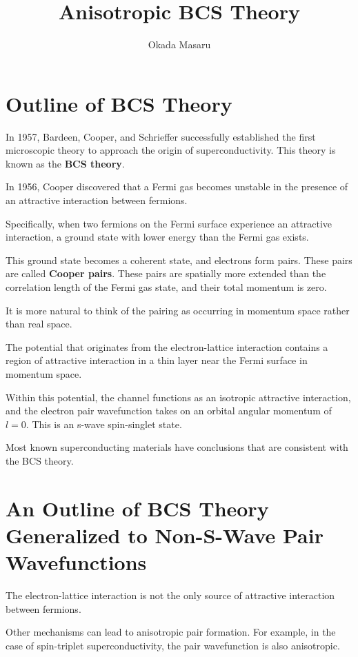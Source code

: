 \documentclass[uplatex,a4j,12pt,dvipdfmx]{jsarticle}
\title{
Anisotropic BCS Theory
}
\author{
Okada Masaru
}
\begin{document}
\maketitle

\section{Outline of BCS Theory}

In 1957, Bardeen, Cooper, and Schrieffer successfully established the first microscopic theory to approach the origin of superconductivity.
This theory is known as the \textbf{BCS theory}.

In 1956, Cooper discovered that a Fermi gas becomes unstable in the presence of an attractive interaction between fermions.

Specifically, when two fermions on the Fermi surface experience an attractive interaction, a ground state with lower energy than the Fermi gas exists.

This ground state becomes a coherent state, and electrons form pairs.
These pairs are called \textbf{Cooper pairs}.
These pairs are spatially more extended than the correlation length of the Fermi gas state, and their total momentum is zero.

It is more natural to think of the pairing as occurring in momentum space rather than real space.

The potential that originates from the electron-lattice interaction contains a region of attractive interaction in a thin layer near the Fermi surface in momentum space.

Within this potential, the channel functions as an isotropic attractive interaction, and the electron pair wavefunction takes on an orbital angular momentum of $l=0$.
This is an s-wave spin-singlet state.

Most known superconducting materials have conclusions that are consistent with the BCS theory.


\section{An Outline of BCS Theory Generalized to Non-S-Wave Pair Wavefunctions}

The electron-lattice interaction is not the only source of attractive interaction between fermions.

Other mechanisms can lead to anisotropic pair formation.
For example, in the case of spin-triplet superconductivity, the pair wavefunction is also anisotropic.
\end{document}
